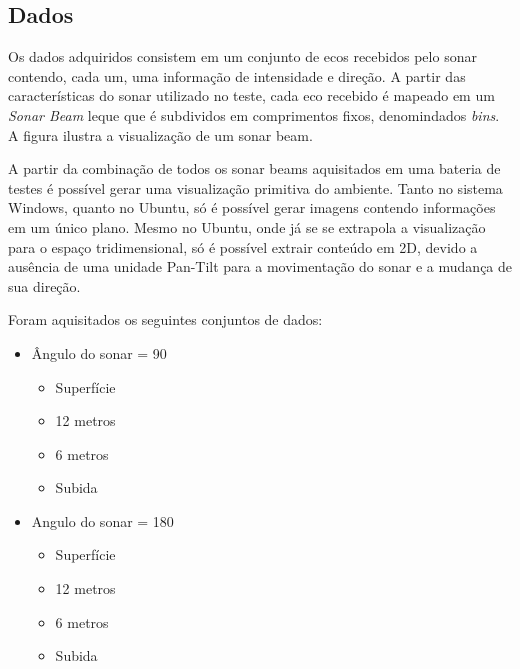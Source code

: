 



\subsection{Dados}
\label{dados}

Os dados adquiridos consistem em um conjunto de ecos recebidos pelo sonar
contendo, cada um, uma informação de intensidade e direção. A partir das
características do sonar utilizado no teste, cada eco recebido é mapeado em um
\textit{Sonar Beam} leque que é subdividos em comprimentos fixos, denomindados
\textit{bins}. A figura %
ilustra a visualização de um sonar beam.

A partir da combinação de todos os sonar beams aquisitados em uma bateria de
testes é possível gerar uma visualização primitiva do ambiente. Tanto no sistema
Windows, quanto no Ubuntu, só é possível gerar imagens contendo informações em
um único plano. Mesmo no Ubuntu, onde já se se extrapola a visualização para o
espaço tridimensional, só é possível extrair conteúdo em 2D, devido a ausência
de uma unidade Pan-Tilt para a movimentação do sonar e a mudança de sua direção.

Foram aquisitados os seguintes conjuntos de dados:

\begin{itemize}
  \item Ângulo do sonar = 90
  \begin{itemize}
    \item Superfície
    \item 12 metros
    \item 6 metros
    \item Subida
  \end{itemize}
  \item Angulo do sonar = 180
  \begin{itemize}
    \item Superfície
    \item 12 metros
    \item 6 metros
    \item Subida
  \end{itemize}
\end{itemize}


  